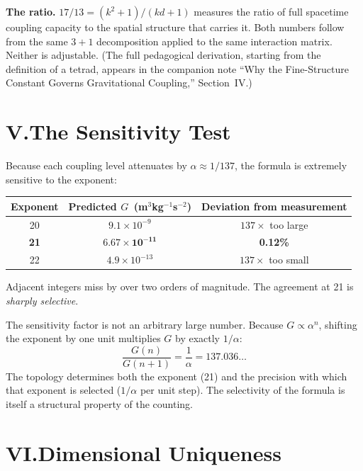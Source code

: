 \documentclass[11pt]{article}
\begin{document}
\textbf{The ratio.}\quad
$17/13 = (k^2 + 1)/(kd + 1)$ measures the ratio of full spacetime coupling capacity to the spatial structure that carries it.
Both numbers follow from the same $3+1$ decomposition applied to the same interaction matrix.
Neither is adjustable.
(The full pedagogical derivation, starting from the definition of a tetrad, appears in the companion note ``Why the Fine-Structure Constant Governs Gravitational Coupling,'' Section~IV.)

\section*{V.\quad The Sensitivity Test}

Because each coupling level attenuates by $\alpha \approx 1/137$, the formula is extremely sensitive to the exponent:

\begin{center}
\begin{tabular}{ccc}
\toprule
\textbf{Exponent} & \textbf{Predicted $G$\, (m$^3$kg$^{-1}$s$^{-2}$)} & \textbf{Deviation from measurement} \\
\midrule
20 & $9.1 \times 10^{-9}$ & $137\times$ too large \\
\textbf{21} & $\bm{6.67 \times 10^{-11}}$ & \textbf{0.12\%} \\
22 & $4.9 \times 10^{-13}$ & $137\times$ too small \\
\bottomrule
\end{tabular}
\end{center}

Adjacent integers miss by over two orders of magnitude.
The agreement at 21 is \emph{sharply selective}.

The sensitivity factor is not an arbitrary large number.
Because $G \propto \alpha^n$, shifting the exponent by one unit multiplies $G$ by exactly $1/\alpha$:
\begin{equation*}
\frac{G(n)}{G(n+1)} = \frac{1}{\alpha} = 137.036\ldots
\end{equation*}
The topology determines both the exponent (21) and the precision with which that exponent is selected ($1/\alpha$ per unit step).
The selectivity of the formula is itself a structural property of the counting.

\section*{VI.\quad Dimensional Uniqueness}
\end{document}
